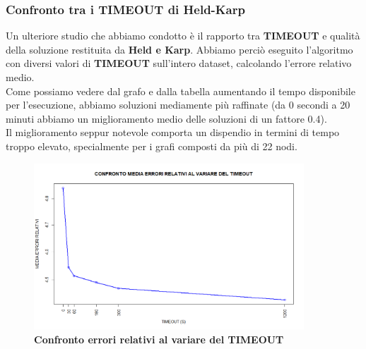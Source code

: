 \documentclass[]{article}
\begin{document}
\begin{flushleft}
\subsubsection{Confronto tra i TIMEOUT di Held-Karp}
Un ulteriore studio che abbiamo condotto è il rapporto tra \textbf{TIMEOUT} e qualità della soluzione restituita da \textbf{Held e Karp}. Abbiamo perciò eseguito l'algoritmo con diversi valori di \textbf{TIMEOUT} sull'intero dataset, calcolando l'errore relativo medio.\\
Come possiamo vedere dal grafo e dalla tabella aumentando il tempo disponibile per l'esecuzione, abbiamo soluzioni mediamente più raffinate (da 0 secondi a 20 minuti abbiamo un miglioramento medio delle soluzioni di un fattore 0.4).\\
Il miglioramento seppur notevole comporta un dispendio in termini di tempo troppo elevato, specialmente per i grafi composti da più di 22 nodi.

\begin{figure}[h]
\centering
\includegraphics[width=0.9\textwidth, height=\textheight,keepaspectratio]{CONFRONTO_TIMEOUT_ERRORI.png}
\caption{\textbf{Confronto errori relativi al variare del TIMEOUT}}
\label{TIMEOUT-err}
\end{figure}

\newpage

\end{flushleft}
\end{document}
